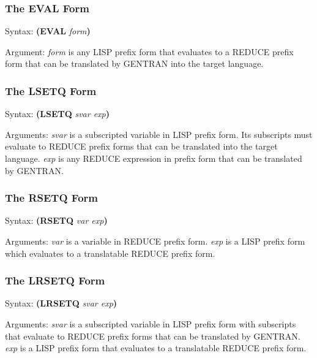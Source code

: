 \subsubsection{The EVAL Form}
\label{sym:eval}
\begin{describe}{Syntax:}
{\bf (EVAL} {\it form\/}{\bf )}
\end{describe} 
\begin{describe}{Argument:}
{\it form\/} is any LISP prefix form that evaluates to a REDUCE prefix form that
can be translated by GENTRAN into the target language.
\end{describe} 

\subsubsection{The LSETQ Form}
\begin{describe}{Syntax:}
{\bf (LSETQ} {\it svar exp\/}{\bf )}
\end{describe} 
\begin{describe}{Arguments:}
{\it svar\/} is a subscripted variable in LISP prefix form.  Its subscripts
must evaluate to REDUCE prefix forms that can be translated
into the target language.  {\it exp\/} is any REDUCE expression in
prefix form that can be translated by GENTRAN.
\end{describe} 

\subsubsection{The RSETQ Form}
\begin{describe}{Syntax:}
{\bf (RSETQ} {\it var exp\/}{\bf )}
\end{describe}
\begin{describe}{Arguments:}
{\it var\/} is a variable in REDUCE prefix form.  {\it exp\/} is a LISP
prefix form which evaluates to a translatable REDUCE prefix form.
\end{describe} 

\subsubsection{The LRSETQ Form}
\label{sym:lrsetq}
\begin{describe}{Syntax:}
{\bf (LRSETQ} {\it svar exp\/}{\bf )}
\end{describe} 
\begin{describe}{Arguments:}
{\it svar\/} is a subscripted variable in LISP prefix form with
subscripts that evaluate to REDUCE prefix forms
that can be translated by GENTRAN.  {\it exp\/} is a LISP prefix
form that evaluates to a translatable REDUCE prefix form.
\end{describe}

